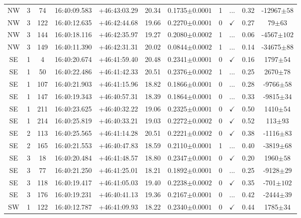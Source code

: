 \begin{landscape}
\begin{longtable}{ccccccccccc}
	NW & 3 & 74 & 16:40:09.583 & +46:43:03.29 & 20.34 & 0.1735$\pm{0.0001}$ & 1 & ... & 0.32 & -12967$\pm{58}$ \\
	NW & 3 & 122 & 16:40:12.635 & +46:42:44.68 & 19.66 & 0.2270$\pm{0.0001}$ & 0 & $\checkmark$ & 0.27 & 79$\pm{63}$ \\
	NW & 3 & 144 & 16:40:18.116 & +46:42:35.97 & 19.27 & 0.2080$\pm{0.0002}$ & 1 & ... & 0.06 & -4567$\pm{102}$ \\
	NW & 3 & 149 & 16:40:11.390 & +46:42:31.31 & 20.02 & 0.0844$\pm{0.0002}$ & 1 & ... & 0.14 & -34675$\pm{88}$ \\
	SE & 1 & 4 & 16:40:20.674 & +46:41:59.40 & 20.48 & 0.2341$\pm{0.0001}$ & 0 & $\checkmark$ & 0.16 & 1797$\pm{54}$ \\
	SE & 1 & 50 & 16:40:22.486 & +46:41:42.33 & 20.51 & 0.2376$\pm{0.0002}$ & 1 & ... & 0.25 & 2670$\pm{78}$ \\
	SE & 1 & 107 & 16:40:21.903 & +46:41:15.96 & 18.82 & 0.1866$\pm{0.0001}$ & 0 & ... & 0.28 & -9766$\pm{58}$ \\
	SE & 1 & 147 & 16:40:19.343 & +46:40:57.31 & 18.39 & 0.1864$\pm{0.0001}$ & 0 & ... & 0.33 & -9815$\pm{34}$ \\
	SE & 1 & 211 & 16:40:23.625 & +46:40:32.22 & 19.06 & 0.2325$\pm{0.0001}$ & 0 & $\checkmark$ & 0.50 & 1410$\pm{54}$ \\
	SE & 1 & 214 & 16:40:25.819 & +46:40:33.21 & 19.03 & 0.2272$\pm{0.0002}$ & 0 & $\checkmark$ & 0.52 & 113$\pm{93}$ \\
	SE & 2 & 113 & 16:40:25.565 & +46:41:14.28 & 20.51 & 0.2221$\pm{0.0002}$ & 0 & $\checkmark$ & 0.38 & -1116$\pm{83}$ \\
	SE & 2 & 165 & 16:40:21.553 & +46:40:47.83 & 18.59 & 0.2110$\pm{0.0001}$ & 1 & ... & 0.40 & -3819$\pm{68}$ \\
	SE & 3 & 18 & 16:40:20.484 & +46:41:48.57 & 18.80 & 0.2347$\pm{0.0001}$ & 0 & $\checkmark$ & 0.20 & 1960$\pm{58}$ \\
	SE & 3 & 77 & 16:40:21.250 & +46:41:25.01 & 18.21 & 0.1892$\pm{0.0001}$ & 0 & ... & 0.25 & -9128$\pm{29}$ \\
	SE & 3 & 118 & 16:40:19.417 & +46:41:05.03 & 19.40 & 0.2238$\pm{0.0002}$ & 0 & $\checkmark$ & 0.35 & -701$\pm{102}$ \\
	SE & 3 & 176 & 16:40:19.231 & +46:40:41.13 & 19.36 & 0.2167$\pm{0.0001}$ & 0 & ... & 0.42 & -2444$\pm{39}$ \\
	SW & 1 & 122 & 16:40:12.787 & +46:41:09.93 & 18.22 & 0.2340$\pm{0.0001}$ & 0 & $\checkmark$ & 0.44 & 1785$\pm{34}$ \\

\end{longtable}
\end{landscape}
